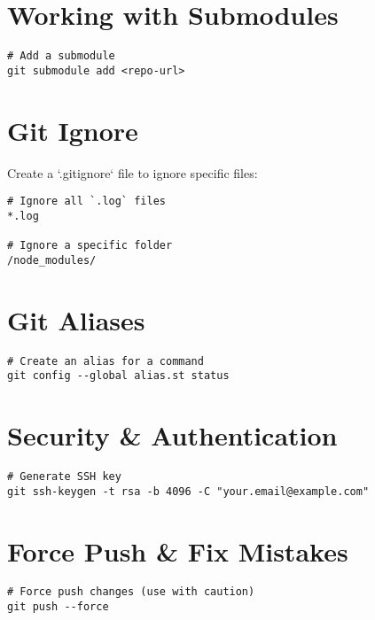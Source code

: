 \documentclass{article}
\begin{document}
\section{Working with Submodules}
\begin{lstlisting}
# Add a submodule
git submodule add <repo-url>
\end{lstlisting}

\section{Git Ignore}
Create a `.gitignore` file to ignore specific files:
\begin{lstlisting}
# Ignore all `.log` files
*.log

# Ignore a specific folder
/node_modules/
\end{lstlisting}

\section{Git Aliases}
\begin{lstlisting}
# Create an alias for a command
git config --global alias.st status
\end{lstlisting}

\section{Security \& Authentication}
\begin{lstlisting}
# Generate SSH key
git ssh-keygen -t rsa -b 4096 -C "your.email@example.com"
\end{lstlisting}

\section{Force Push \& Fix Mistakes}
\begin{lstlisting}
# Force push changes (use with caution)
git push --force
\end{lstlisting}
\end{document}

